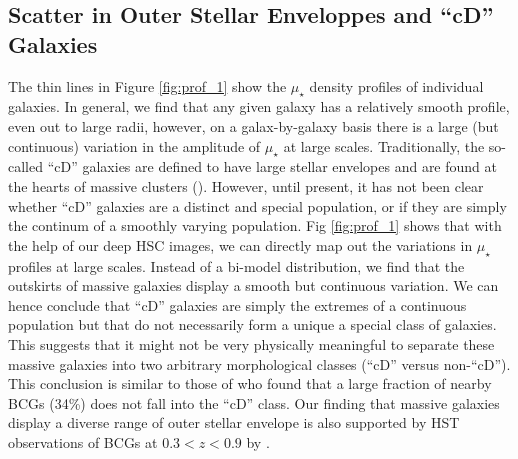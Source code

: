 \documentclass[a4paper,fleqn,usenatbib]{mnras}
\def\mden{{$\mu_{\star}$}}
\begin{document}
\subsection{Scatter in Outer Stellar Enveloppes and ``cD'' Galaxies}
        
   The thin lines in Figure \ref{fig:prof_1} show the \mden{} density profiles of 
   individual galaxies. 
   In general, we find that any given galaxy has a relatively smooth profile, even out 
   to large radii, however, on a galax-by-galaxy basis there is a large (but continuous) 
   variation in the amplitude of \mden{} at large scales. 
   Traditionally, the so-called ``cD'' galaxies are defined to have large stellar 
   envelopes and are found at the hearts of massive clusters (\citealt{Matthews1964, 
   Schombert1988}). 
   However, until present, it has not been clear whether ``cD'' galaxies are a distinct 
   and special population, or if they are simply the continum of a smoothly varying 
   population. 
   Fig \ref{fig:prof_1} shows that with the help of our deep HSC images, we can directly 
   map out the variations in \mden{} profiles at large scales. 
   Instead of a bi-model distribution, we find that the outskirts of massive galaxies 
   display a smooth but continuous variation. 
   We can hence conclude that ``cD'' galaxies are simply the extremes of a continuous 
   population but that do not necessarily form a unique a special class of galaxies. 
   This suggests that it might not be very physically meaningful to separate these 
   massive galaxies into two arbitrary morphological classes (``cD'' versus non-``cD''). 
   This conclusion is similar to those of \citep{Zhao2015} who found that a large 
   fraction of nearby BCGs (34\%) does not fall into the ``cD'' class. 
   Our finding that massive galaxies display a diverse range of outer stellar 
   envelope is also supported by HST observations of BCGs at $0.3 < z <0.9$ 
   by \citealt{Bai2014}.
   
\end{document}
